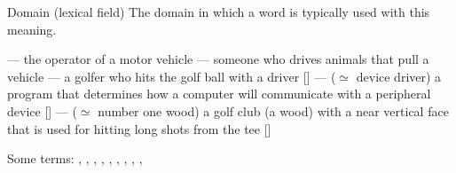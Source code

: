 \begin{frame}{Domain (lexical field)}
The domain in which a word is typically used with this meaning.

\begin{exe}
  \ex {} --- the operator of a motor vehicle
  \ex {} --- someone who drives animals that pull a vehicle
  \ex {} --- a golfer who hits the golf ball with a driver [] 
  \ex {} --- ($\simeq$ device driver) a program that determines how a computer will communicate with a peripheral device [] 
  \ex {} --- ($\simeq$ number one wood) a golf club (a wood) with a near vertical face that is used for hitting long shots from the tee [] 
\end{exe}

Some  terms: , , , , , , , , , 


\end{frame}
